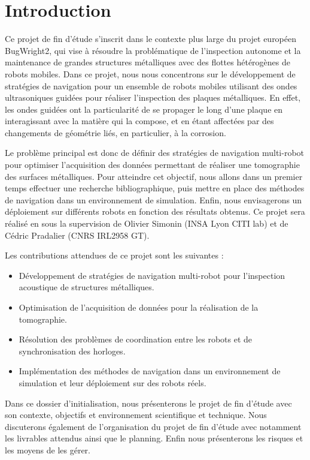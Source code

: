 \documentclass[init,francais,RandD]{rapportPFE}  %
\begin{document}
	\section{Introduction}
		Ce projet de fin d'étude s'inscrit dans le contexte plus large du projet européen BugWright2, qui vise à résoudre la problématique de l'inspection autonome et la maintenance de grandes structures métalliques avec des flottes hétérogènes de robots mobiles. Dans ce projet, nous nous concentrons sur le développement de stratégies de navigation pour un ensemble de robots mobiles utilisant des ondes ultrasoniques guidées pour réaliser l'inspection des plaques métalliques. En effet, les ondes guidées ont la particularité de se propager le long d'une plaque en interagissant avec la matière qui la compose, et en étant affectées par des changements de géométrie liés, en particulier, à la corrosion.

		Le problème principal est donc de définir des stratégies de navigation multi-robot pour optimiser l'acquisition des données permettant de réaliser une tomographie des surfaces métalliques. Pour atteindre cet objectif, nous allons dans un premier temps effectuer une recherche bibliographique, puis mettre en place des méthodes de navigation dans un environnement de simulation. Enfin, nous envisagerons un déploiement sur différents robots en fonction des résultats obtenus. Ce projet sera réalisé en sous la supervision de Olivier Simonin (INSA Lyon CITI lab) et de Cédric Pradalier (CNRS IRL2958 GT).

		Les contributions attendues de ce projet sont les suivantes :
		\begin{itemize}
			\item Développement de stratégies de navigation multi-robot pour l'inspection acoustique de structures métalliques.
			\item Optimisation de l'acquisition de données pour la réalisation de la tomographie.
			\item Résolution des problèmes de coordination entre les robots et de synchronisation des horloges.
			\item Implémentation des méthodes de navigation dans un environnement de simulation et leur déploiement sur des robots réels.
		\end{itemize}

		Dans ce dossier d'initialisation, nous présenterons le projet de fin d'étude avec son contexte, objectifs et environnement scientifique et technique. Nous discuterons également de l'organisation du projet de fin d'étude avec notamment les livrables attendus ainsi que le planning. Enfin nous présenterons les risques et les moyens de les gérer.
\end{document}
